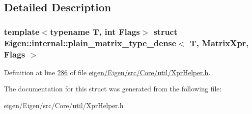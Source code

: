 \subsection{Detailed Description}
\subsubsection*{template$<$typename T, int Flags$>$\newline
struct Eigen\+::internal\+::plain\+\_\+matrix\+\_\+type\+\_\+dense$<$ T, Matrix\+Xpr, Flags $>$}



Definition at line \hyperlink{eigen_2_eigen_2src_2_core_2util_2_xpr_helper_8h_source_l00286}{286} of file \hyperlink{eigen_2_eigen_2src_2_core_2util_2_xpr_helper_8h_source}{eigen/\+Eigen/src/\+Core/util/\+Xpr\+Helper.\+h}.



The documentation for this struct was generated from the following file\+:\begin{DoxyCompactItemize}
\item 
eigen/\+Eigen/src/\+Core/util/\+Xpr\+Helper.\+h\end{DoxyCompactItemize}
